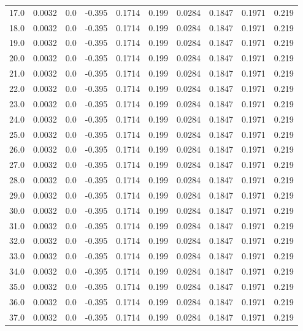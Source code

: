 \begin{longtable}{lrrrrrrrrr}
17.0 & 0.0032 & 0.0 & -0.395 & 0.1714 & 0.199 & 0.0284 & 0.1847 & 0.1971 & 0.219 \\
18.0 & 0.0032 & 0.0 & -0.395 & 0.1714 & 0.199 & 0.0284 & 0.1847 & 0.1971 & 0.219 \\
19.0 & 0.0032 & 0.0 & -0.395 & 0.1714 & 0.199 & 0.0284 & 0.1847 & 0.1971 & 0.219 \\
20.0 & 0.0032 & 0.0 & -0.395 & 0.1714 & 0.199 & 0.0284 & 0.1847 & 0.1971 & 0.219 \\
21.0 & 0.0032 & 0.0 & -0.395 & 0.1714 & 0.199 & 0.0284 & 0.1847 & 0.1971 & 0.219 \\
22.0 & 0.0032 & 0.0 & -0.395 & 0.1714 & 0.199 & 0.0284 & 0.1847 & 0.1971 & 0.219 \\
23.0 & 0.0032 & 0.0 & -0.395 & 0.1714 & 0.199 & 0.0284 & 0.1847 & 0.1971 & 0.219 \\
24.0 & 0.0032 & 0.0 & -0.395 & 0.1714 & 0.199 & 0.0284 & 0.1847 & 0.1971 & 0.219 \\
25.0 & 0.0032 & 0.0 & -0.395 & 0.1714 & 0.199 & 0.0284 & 0.1847 & 0.1971 & 0.219 \\
26.0 & 0.0032 & 0.0 & -0.395 & 0.1714 & 0.199 & 0.0284 & 0.1847 & 0.1971 & 0.219 \\
27.0 & 0.0032 & 0.0 & -0.395 & 0.1714 & 0.199 & 0.0284 & 0.1847 & 0.1971 & 0.219 \\
28.0 & 0.0032 & 0.0 & -0.395 & 0.1714 & 0.199 & 0.0284 & 0.1847 & 0.1971 & 0.219 \\
29.0 & 0.0032 & 0.0 & -0.395 & 0.1714 & 0.199 & 0.0284 & 0.1847 & 0.1971 & 0.219 \\
30.0 & 0.0032 & 0.0 & -0.395 & 0.1714 & 0.199 & 0.0284 & 0.1847 & 0.1971 & 0.219 \\
31.0 & 0.0032 & 0.0 & -0.395 & 0.1714 & 0.199 & 0.0284 & 0.1847 & 0.1971 & 0.219 \\
32.0 & 0.0032 & 0.0 & -0.395 & 0.1714 & 0.199 & 0.0284 & 0.1847 & 0.1971 & 0.219 \\
33.0 & 0.0032 & 0.0 & -0.395 & 0.1714 & 0.199 & 0.0284 & 0.1847 & 0.1971 & 0.219 \\
34.0 & 0.0032 & 0.0 & -0.395 & 0.1714 & 0.199 & 0.0284 & 0.1847 & 0.1971 & 0.219 \\
35.0 & 0.0032 & 0.0 & -0.395 & 0.1714 & 0.199 & 0.0284 & 0.1847 & 0.1971 & 0.219 \\
36.0 & 0.0032 & 0.0 & -0.395 & 0.1714 & 0.199 & 0.0284 & 0.1847 & 0.1971 & 0.219 \\
37.0 & 0.0032 & 0.0 & -0.395 & 0.1714 & 0.199 & 0.0284 & 0.1847 & 0.1971 & 0.219 \\

\end{longtable}

